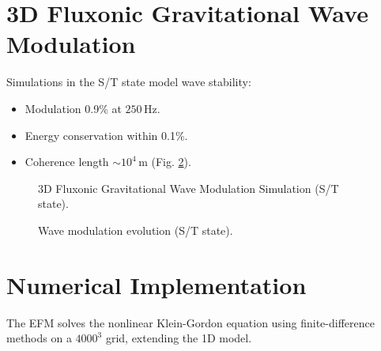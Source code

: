 \documentclass[11pt]{article}
\begin{document}
\section{3D Fluxonic Gravitational Wave Modulation}
Simulations in the S/T state model wave stability:
\begin{itemize}
    \item Modulation 0.9\% at \(250 \, \text{Hz}\).
    \item Energy conservation within 0.1\%.
    \item Coherence length \(\sim 10^4 \, \text{m}\) (Fig. \ref{fig:wave_mod}).
\end{itemize}

\begin{figure}[ht]
    \centering
    \caption{3D Fluxonic Gravitational Wave Modulation Simulation (S/T state).}
    \label{fig:3Dwave}
\end{figure}

\begin{figure}[ht]
    \centering
    \caption{Wave modulation evolution (S/T state).}
    \label{fig:wave_mod}
\end{figure}

\section{Numerical Implementation}
The EFM solves the nonlinear Klein-Gordon equation using finite-difference methods on a \(4000^3\) grid, extending the 1D model.
\end{document}
